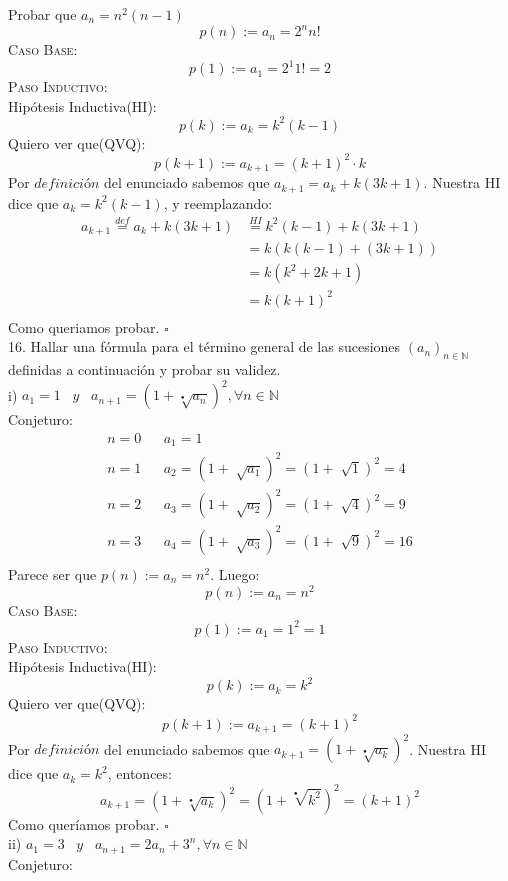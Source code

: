 \documentclass[a4paper,11pt]{article}
\begin{document}
Probar que $a_n = n^2(n-1)$\\
\[p(n) := a_n = 2^n n!\]
\textsc{Caso Base}:\\
\[p(1):= a_1 = 2^1 1! = 2 \]
\textsc{Paso Inductivo}:\\
Hipótesis Inductiva(HI):\[p(k):= a_k = k^2(k-1)\]
Quiero ver que(QVQ):\[p(k+1):= a_{k+1} = (k+1)^2\cdot k\]
Por $\textit{definición}$ del enunciado sabemos que $a_{k+1} =  a_k +k(3k+1) $. Nuestra HI dice que $a_k =  k^2(k-1)$, y reemplazando:
\begin{align*}
a_{k+1} \overset{def}{=} a_k +k(3k+1) & \overset{HI}{=} k^2(k-1) + k(3k+1) \\
      & = k(k(k-1)+(3k+1)) \\
      & =  k(k^2+2k+1)\\
      & =  k(k+1)^2\\
\end{align*}
Como queriamos probar. 
\hfill$\square$\\
16. Hallar una fórmula para el término general de las sucesiones $(a_n)_{n \in \mathbb{N}}$ definidas a continuación y probar su validez.\\
i) $a_1 = 1\;\;\;y\;\;\;a_{n+1} = (1 + \sqrt[•]{a_n})^2, \forall n \in \mathbb{N}$\\
Conjeturo:\\ 
\begin{align*}
n = 0 & &a_1 = 1 \\
n = 1 & &a_2 = (1 + \sqrt[]{a_1})^2 = (1 + \sqrt[]{1})^2 = 4\\ 
n = 2 & &a_3 = (1 + \sqrt[]{a_2})^2 = (1 + \sqrt[]{4})^2 = 9 \\
n = 3 & &a_4 = (1 + \sqrt[]{a_3})^2 = (1 + \sqrt[]{9})^2 = 16 \\
\end{align*}
Parece ser que $p(n) := a_n = n^2$. Luego:
\[p(n) := a_n = n^2\]
\textsc{Caso Base}:\\
\[p(1):= a_1 = 1^2 = 1 \]
\textsc{Paso Inductivo}:\\
Hipótesis Inductiva(HI):\[p(k):= a_k = k^2\]
Quiero ver que(QVQ):\[p(k+1):= a_{k+1} = (k+1)^2\]
Por $\textit{definición}$ del enunciado sabemos que $a_{k+1} = (1 + \sqrt[•]{a_k})^2  $. Nuestra HI dice que $a_k =  k^2$, entonces:\\
\[a_{k+1}= (1 + \sqrt[•]{a_k})^2 = (1 + \sqrt[•]{k^2})^2 = (k+1)^2\]
Como queríamos probar.
\hfill$\square$\\
ii) $a_1 = 3\;\;\;y\;\;\;a_{n+1} = 2a_n + 3^n, \forall n \in \mathbb{N}$\\
Conjeturo:\\ 
\end{document}

